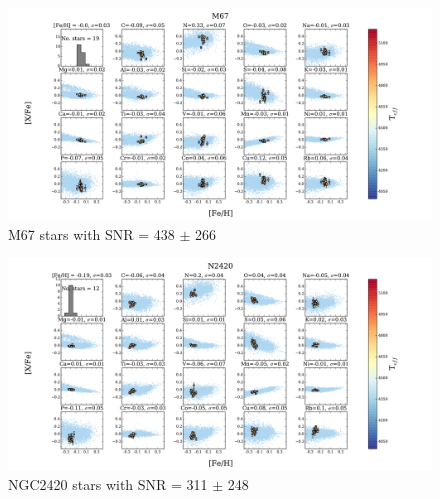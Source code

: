 \documentclass[14pt, preprint2]{aastex6}
\begin{document}
\begin{figure}
\centering
               \includegraphics[scale=0.5]{20elem7_tc2_nofilt.pdf}
  \caption{ M67 stars with SNR = 438 $\pm$ 266 }
\label{fig:c1}
\end{figure}

\begin{figure}
\centering
  \includegraphics[scale=0.5]{20elem12_tc2_nofilt.pdf}  
  \caption{ NGC2420 stars with SNR = 311 $\pm$ 248 }
\label{fig:c2}
\end{figure}
\end{document}
